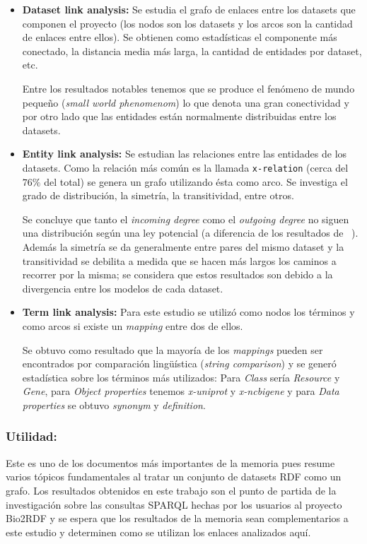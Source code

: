 \documentclass[spanish, fleqn]{article}
\begin{document}
\begin{itemize}
    \item 
        \textbf{Dataset link analysis:} Se estudia el grafo de enlaces entre
        los datasets que componen el proyecto (los nodos son los datasets y los
        arcos son la cantidad de enlaces entre ellos). Se obtienen como 
        estadísticas el componente más conectado, la distancia media más larga,
        la cantidad de entidades por dataset, etc.

        Entre los resultados notables tenemos que se produce el fenómeno de
        mundo pequeño (\emph{small world phenomenom}) lo que denota una gran
        conectividad y por otro lado que las entidades están normalmente
        distribuidas entre los datasets.
    \item
        \textbf{Entity link analysis:} Se estudian las relaciones entre las
        entidades de los datasets. Como la relación más común es la llamada
        \texttt{x-relation} (cerca del $76\%$ del total) se genera un grafo
        utilizando ésta como arco. Se investiga el grado de distribución,
        la simetría, la transitividad, entre otros.

        Se concluye que tanto el \emph{incoming degree} como el \emph{outgoing
        degree} no siguen una distribución según una ley potencial (a diferencia
        de los resultados de ~\cite{broder2000graph}). Además la simetría se da
        generalmente entre pares del mismo dataset y la transitividad se
        debilita a medida que se hacen más largos los caminos a recorrer por la
        misma; se considera que estos resultados son debido a la divergencia
        entre los modelos de cada dataset.

    \item
        \textbf{Term link analysis:} Para este estudio se utilizó como nodos los
        términos y como arcos si existe un \emph{mapping} entre dos de ellos.

        Se obtuvo como resultado que la mayoría de los \emph{mappings} pueden
        ser encontrados por comparación lingüística (\emph{string comparison})
        y se generó estadística sobre los términos más utilizados: Para
        \emph{Class} sería \emph{Resource} y \emph{Gene}, para \emph{Object
        properties} tenemos \emph{x-uniprot} y \emph{x-ncbigene} y para
        \emph{Data properties} se obtuvo \emph{synonym} y \emph{definition}.
\end{itemize}

\subsubsection*{Utilidad:}
Este es uno de los documentos más importantes de la memoria pues resume varios
tópicos fundamentales al tratar un conjunto de datasets RDF como un grafo. Los
resultados obtenidos en este trabajo son el punto de partida de la investigación
sobre las consultas SPARQL hechas por los usuarios al proyecto Bio2RDF y se
espera que los resultados de la memoria sean complementarios a este estudio y
determinen como se utilizan los enlaces analizados aquí.
\end{document}
